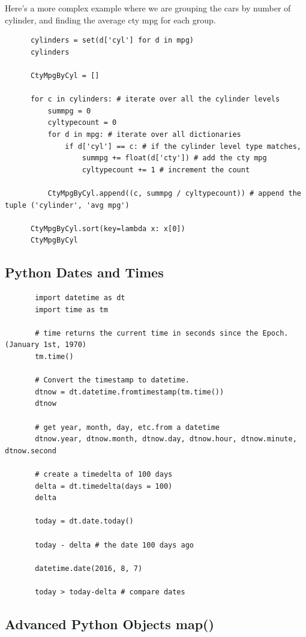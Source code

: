 \documentclass[11pt]{article}
\begin{document}
    \noindent
    Here's a more complex example where we are grouping the cars by
    number of cylinder, and finding the average cty mpg for each group.
    \begin{lstlisting}
      cylinders = set(d['cyl'] for d in mpg)
      cylinders
      
      CtyMpgByCyl = []
      
      for c in cylinders: # iterate over all the cylinder levels
          summpg = 0
          cyltypecount = 0
          for d in mpg: # iterate over all dictionaries
              if d['cyl'] == c: # if the cylinder level type matches,
                  summpg += float(d['cty']) # add the cty mpg
                  cyltypecount += 1 # increment the count

          CtyMpgByCyl.append((c, summpg / cyltypecount)) # append the tuple ('cylinder', 'avg mpg')

      CtyMpgByCyl.sort(key=lambda x: x[0])
      CtyMpgByCyl
     \end{lstlisting}

    \subsection{Python Dates and Times}
     \begin{lstlisting}
       import datetime as dt
       import time as tm

       # time returns the current time in seconds since the Epoch. (January 1st, 1970)
       tm.time()
       
       # Convert the timestamp to datetime.
       dtnow = dt.datetime.fromtimestamp(tm.time())
       dtnow

       # get year, month, day, etc.from a datetime
       dtnow.year, dtnow.month, dtnow.day, dtnow.hour, dtnow.minute, dtnow.second 

       # create a timedelta of 100 days
       delta = dt.timedelta(days = 100)  
       delta

       today = dt.date.today()
       
       today - delta # the date 100 days ago

       datetime.date(2016, 8, 7)

       today > today-delta # compare dates
     \end{lstlisting}


    
    \subsection{Advanced Python Objects map()}
    
\end{document}
